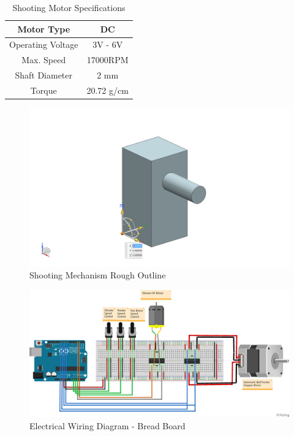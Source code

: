 \documentclass[11pt]{article}
\begin{document}
\begin{table}[H]
\begin{center}
\begin{tabular}{|c|c|}
	\hline 
	Motor Type & DC \\ 
	\hline 
	Operating Voltage & 3V - 6V \\ 
	\hline 
	Max. Speed & 17000RPM \\ 
	\hline 
	Shaft Diameter & 2 mm \\ 
	\hline 
	Torque & 20.72 g/cm \\ 
	\hline 
\end{tabular} 
\caption{Shooting Motor Specifications}
\label{table:motorspecs}
\end{center}
\end{table}

\begin{figure}[H]
   \centering
   \includegraphics[width=1\textwidth]{img/Shooting_Mechanism.png} %
   \caption{Shooting Mechanism Rough Outline}
   \label{fig:shootingmechanismoutline}
\end{figure}

\begin{figure}[H]
   \centering
   \includegraphics[width=1\textwidth]{img/Electrical_Wiring_Diagram_bb.png} %
   \caption{Electrical Wiring Diagram - Bread Board}
   \label{fig:electricalwiringdiagrambb}
\end{figure}
\end{document}

